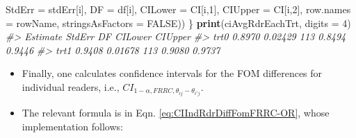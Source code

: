 \documentclass[
]{book}
\newenvironment{Shaded}{\begin{snugshade}}{\end{snugshade}}
\newcommand{\CommentTok}[1]{\textcolor[rgb]{0.56,0.35,0.01}{\textit{#1}}}
\newcommand{\DataTypeTok}[1]{\textcolor[rgb]{0.13,0.29,0.53}{#1}}
\newcommand{\DecValTok}[1]{\textcolor[rgb]{0.00,0.00,0.81}{#1}}
\newcommand{\KeywordTok}[1]{\textcolor[rgb]{0.13,0.29,0.53}{\textbf{#1}}}
\newcommand{\NormalTok}[1]{#1}
\newcommand{\OtherTok}[1]{\textcolor[rgb]{0.56,0.35,0.01}{#1}}
\providecommand{\tightlist}{%
  \setlength{\itemsep}{0pt}\setlength{\parskip}{0pt}}
\begin{document}
\begin{Shaded}
\begin{Highlighting}[]
                     \DataTypeTok{StdErr =}\NormalTok{ stdErr[i],}
                     \DataTypeTok{DF =}\NormalTok{ df[i],}
                     \DataTypeTok{CILower =}\NormalTok{ CI[i,}\DecValTok{1}\NormalTok{],}
                     \DataTypeTok{CIUpper =}\NormalTok{ CI[i,}\DecValTok{2}\NormalTok{],}
                     \DataTypeTok{row.names =}\NormalTok{ rowName,}
                     \DataTypeTok{stringsAsFactors =} \OtherTok{FALSE}\NormalTok{))}
\NormalTok{\}}
\KeywordTok{print}\NormalTok{(ciAvgRdrEachTrt, }\DataTypeTok{digits =} \DecValTok{4}\NormalTok{)}
\CommentTok{#>      Estimate  StdErr  DF CILower CIUpper}
\CommentTok{#> trt0   0.8970 0.02429 113  0.8494  0.9446}
\CommentTok{#> trt1   0.9408 0.01678 113  0.9080  0.9737}
\end{Highlighting}
\end{Shaded}

\begin{itemize}
\tightlist
\item
  Finally, one calculates confidence intervals for the FOM differences for individual readers, i.e., \(CI_{1-\alpha,FRRC,\theta_{i j} - \theta_{i' j}}\).
\item
  The relevant formula is in Eqn. \eqref{eq:CIIndRdrDiffFomFRRC-OR}, whose implementation follows:
\end{itemize}
\end{document}

